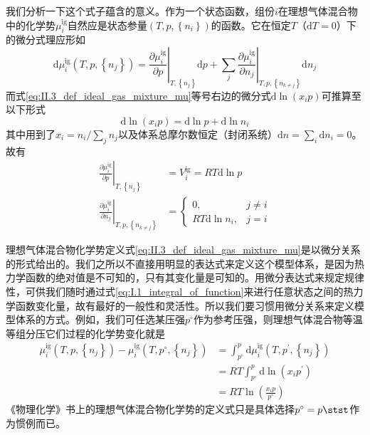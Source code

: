 \documentclass[main.tex]{subfiles}
\begin{document}
我们分析一下这个式子蕴含的意义。作为一个状态函数，组份$i$在理想气体混合物中的化学势$\mu_i^\text{ig}$自然应是状态参量$\left(T,p,\left\{n_i\right\}\right)$的函数。它在恒定$T$（$\mathrm{d}T=0$）下的微分式理应形如
\[\mathrm{d}\mu_i^\text{ig}\left(T,p,\left\{n_j\right\}\right)=\left.\frac{\partial \mu_i^\text{ig}}{\partial p}\right|_{T,\left\{n_j\right\}}\mathrm{d}p+\sum_j\left.\frac{\partial\mu_i^\text{ig}}{\partial n_j}\right|_{T,p,\left\{n_{k\neq j}\right\}}\mathrm{d}n_j\]
而式\eqref{eq:II.3_def_ideal_gas_mixture_mu}等号右边的微分式$\mathrm{d}\ln\left(x_ip\right)$可推算至以下形式
\[\mathrm{d}\ln\left(x_ip\right)=\mathrm{d}\ln p+\mathrm{d}\ln n_i\]
其中用到了$x_i=n_i/\sum_jn_j$以及体系总摩尔数恒定（封闭系统）$\mathrm{d}n=\sum_i\mathrm{d}n_i=0$。故有
\begin{align*}
    \left.\frac{\partial \mu_i^\text{ig}}{\partial p}\right|_{T,\left\{n_j\right\}}             & =V_i^\text{ig}=RT\mathrm{d}\ln p                                                \\
    \left.\frac{\partial \mu_i^\text{ig}}{\partial n_j}\right|_{T,p,\left\{n_{k\neq j}\right\}} & =\left\{\begin{array}{ll}0,&j\neq i\\RT\mathrm{d}\ln n_i,&j=i\end{array}\right.
\end{align*}

理想气体混合物化学势定义式\eqref{eq:II.3_def_ideal_gas_mixture_mu}是以微分关系的形式给出的。我们之所以不直接用明显的表达式来定义这个模型体系，是因为热力学函数的绝对值是不可知的，只有其变化量是可知的。用微分表达式来规定规律性，可供我们随时通过式\eqref{eq:I.1_integral_of_function}来进行任意状态之间的热力学函数变化量，故有最好的一般性和灵活性。所以我们要习惯用微分关系来定义模型体系的方式。例如，我们可任选某压强$p^\circ$作为参考压强，则理想气体混合物等温等组分压它们过程的化学势变化就是
\begin{equation}\label{eq:II.3_ideal_gas_mixture_mu_p0}
    \begin{aligned}
        \mu_i^\text{ig}\left(T,p,\left\{n_j\right\}\right)-\mu_i^\text{ig}\left(T,p^\circ,\left\{n_j\right\}\right) & =\int_{p^\circ}^p\mathrm{d}\mu_i^\text{ig}\left(T,p^\prime,\left\{n_j\right\}\right) \\
                                                                                                                    & =RT\int_{p^\circ}^p\mathrm{d}\ln\left(x_ip^\prime\right)                             \\
                                                                                                                    & =RT\ln\left(\frac{x_ip}{p^\circ}\right)
    \end{aligned}
\end{equation}
《物理化学》书上的理想气体混合物化学势的定义式只是具体选择$p^\circ=p\stst$作为惯例而已。
\end{document}
